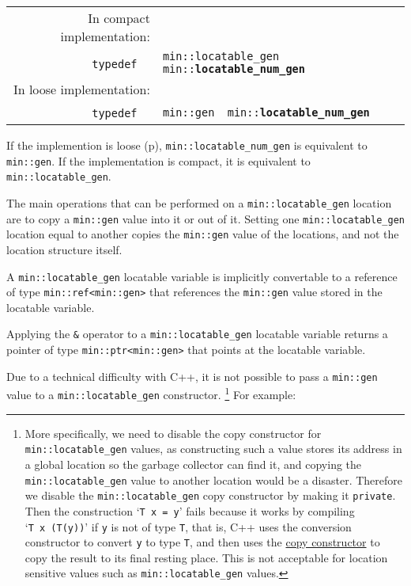 \documentclass[12pt]{article}
\makeatletter
\newcommand{\ttindex}[1]{\index{#1@{\tt #1}}}
\newcommand{\minindex}[1]{\ttindex{min::#1}\ttindex{#1}}
\newcommand{\pagref}[1]{p\pageref{#1}}
\newcommand{\EOL}{\penalty \exhyphenpenalty}
\newenvironment{indpar}[1][0.3in]%
	{\begin{list}{}%
		     {\setlength{\itemsep}{0in}%
		      \setlength{\topsep}{0in}%
		      \setlength{\parsep}{1ex}%
		      \setlength{\labelwidth}{#1}%
		      \setlength{\leftmargin}{#1}%
		      \addtolength{\leftmargin}{\labelsep}}%
	 \item}%
	{\end{list}}
\newcommand{\LABEL}[1]{\label{#1}}
\newcommand{\MINKEY}[1]{{\tt \bf #1}\minindex{#1}}
\makeatother
\begin{document}
\begin{indpar}[0.1in]\begin{tabular}{r@{}l}
In compact implementation: \\
~~~~\verb|typedef  |
	& \verb|min::locatable_gen  min::|\MINKEY{locatable\_num\_gen} \\
In loose implementation: \\
~~~~\verb|typedef  |
	& \verb|min::gen  min::|\MINKEY{locatable\_num\_gen}
\LABEL{MIN::LOCATABLE_NUM_GEN_TYPEDEF} \\
\end{tabular}\end{indpar}

If the implemention is loose (\pagref{LOOSE}),
{\tt min::locatable\_\EOL num\_\EOL gen} is equivalent to
{\tt min::gen}.  If the implementation is compact, it is equivalent to
{\tt min::locatable\_\EOL gen}.

The main operations that can be performed on a
{\tt min::locatable\_\EOL gen} location are to copy a {\tt min::gen}
value into it or out of it.  Setting one {\tt min::\EOL locatable\_\EOL gen}
location equal to another copies the {\tt min::gen} value of the locations,
and not the location structure itself.

A {\tt min::\EOL locatable\_\EOL gen} locatable variable
\label{LOCATABLE_VAR_REF}
is implicitly convertable to a
reference
of type {\tt min::\EOL ref<min::gen>}
that references the {\tt min::gen}
value stored in the locatable variable.

Applying the {\tt \&} operator to a
\label{LOCATABLE_VAR_PTR}
{\tt min::\EOL locatable\_\EOL gen} locatable variable
returns a pointer of type {\tt min::\EOL ptr<min::gen>} that points
at the locatable variable.

Due to a technical difficulty with C++, it is not possible to pass a
{\tt min::gen} value to a {\tt min::\EOL locatable\_\EOL gen} constructor.%
%
\footnote{\label{LOCATABLE-VAR-COPY-FOOTNOTE}
More specifically, we need to disable the copy constructor
for {\tt min::\EOL locatable\_\EOL gen} values, as constructing such a
value stores its address in a global location so the garbage collector
can find it, and copying the {\tt min::\EOL locatable\_\EOL gen} value
to another location would be a disaster.  Therefore we disable the
{\tt min::\EOL locatable\_\EOL gen}
copy constructor by making it {\tt private}.
Then the construction `{\tt T~x~=~y}' fails because it works
by compiling `{\tt T~x~(T(y))}' if {\tt y} is not of type {\tt T},
that is, C++ uses the conversion constructor to convert {\tt y}
to type {\tt T}, and then uses the \underline{copy constructor}
to copy the result to its final resting place.  This is not acceptable for
location sensitive values such as
{\tt min::\EOL locatable\_\EOL gen} values.}
%
For example:
\end{document}
